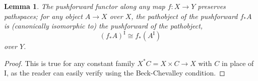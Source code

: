 \documentclass[11pt]{amsart}
\newcommand{\eg}{\emph{e.g.}}
\newcommand{\psh}[1]{\ensuremath{\mathsf{Set}^{#1^{\mathrm{op}}}}}
\newcommand{\Set}{\ensuremath{\mathsf{Set}}}
\newcommand{\cSet}{\ensuremath{\mathsf{cSet}}}
\newcommand{\yon}{\ensuremath{\mathsf{y}}} %
\newcommand{\op}[1]{\ensuremath{{#1}^{\mathrm{op}}}}
\newcommand{\hook}{\ensuremath{\hookrightarrow}}
\renewcommand{\to}{\ensuremath{\rightarrow}}
\newcommand{\I}{\ensuremath{\mathrm{I}}}
\newtheorem{proposition}[theorem]{Proposition}
\newtheorem{lemma}[theorem]{Lemma}
\theoremstyle{remark}
\theoremstyle{definition}
\begin{document}
\begin{lemma}\label{lemma:pathspacepushforward}
The pushforward functor along any map $f : X\to Y$ preserves pathspaces; for any object $A \to X$ over $X$, the pathobject of the pushforward $f_*A$ is (canonically isomorphic to) the pushforward of the pathobject,
\[
(f_*A)^\I \cong f_*(A^\I)\,
\]
over $Y$.
\end{lemma}
\begin{proof}
This is true for any constant family $X^*C = X\times C \to X$ with $C$ in place of $\I$, as the reader can easily verify using the Beck-Chevalley condition.
\end{proof}

%
%
%
%
\end{document}
